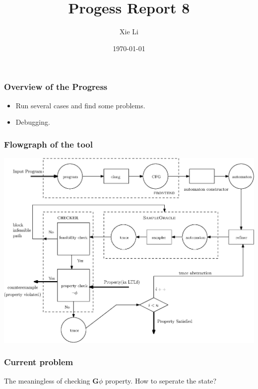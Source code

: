 \documentclass[11pt]{beamer}
\title{Progess Report 8}
\date{\today}
\author{Xie Li}
\begin{document}
\maketitle

\begin{frame}\frametitle{Overview of the Progress}
\begin{itemize}
\item Run several cases and find some problems.
\item Debugging.
\end{itemize}

\end{frame}


\begin{frame}\frametitle{Flowgraph of the tool}

\begin{center}
\includegraphics[scale=0.5]{dataflow.eps}
\end{center}

\end{frame}

\begin{frame}\frametitle{Current problem}
The meaningless of checking $\mathbf{G}\phi$ property. How to seperate the state?

\end{frame}
\end{document}
